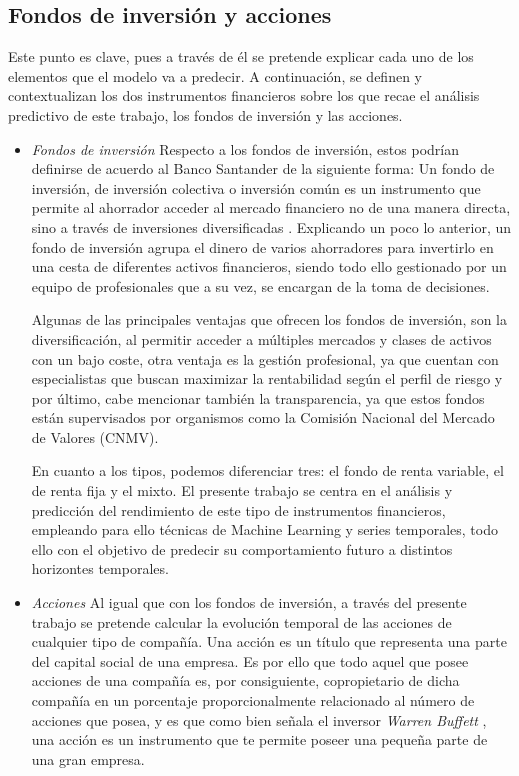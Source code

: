 \subsection{Fondos de inversión y acciones}
Este punto es clave, pues a través de él se pretende explicar cada uno de los elementos que el modelo va a predecir. A continuación, se definen y contextualizan los dos instrumentos financieros sobre los que recae el análisis predictivo de este trabajo, los fondos de inversión y las acciones.

\begin{itemize}
    \item \emph{Fondos de inversión}
    Respecto a los fondos de inversión, estos podrían definirse de acuerdo al Banco Santander \cite{Santander} de la siguiente forma: Un fondo de inversión, de inversión colectiva o inversión común es un instrumento que permite al ahorrador acceder al mercado financiero no de una manera directa, sino a través de inversiones diversificadas \cite{santander_fondos}. Explicando un poco lo anterior, un fondo de inversión agrupa el dinero de varios ahorradores para invertirlo en una cesta de diferentes activos financieros, siendo todo ello gestionado por un equipo de profesionales que a su vez, se encargan de la toma de decisiones. 
    
    Algunas de las principales ventajas que ofrecen los fondos de inversión, son la diversificación, al permitir acceder a múltiples mercados y clases de activos con un bajo coste, otra ventaja es la gestión profesional, ya que cuentan con especialistas que buscan maximizar la rentabilidad según el perfil de riesgo y por último, cabe mencionar también la transparencia, ya que estos fondos están supervisados por organismos como la Comisión Nacional del Mercado de Valores (CNMV). 
    
    En cuanto a los tipos, podemos diferenciar tres: el fondo de renta variable, el de renta fija y el mixto. El presente trabajo se centra en el análisis y predicción del rendimiento de este tipo de instrumentos financieros, empleando para ello técnicas de Machine Learning y series temporales, todo ello con el objetivo de predecir su comportamiento futuro a distintos horizontes temporales.

    \item \emph{Acciones}
    Al igual que con los fondos de inversión, a través del presente trabajo se pretende calcular la evolución temporal de las acciones de cualquier tipo de compañía. Una acción es un título que representa una parte del capital social de una empresa. Es por ello que todo aquel que posee acciones de una compañía es, por consiguiente, copropietario de dicha compañía en un porcentaje proporcionalmente relacionado al número de acciones que posea, y es que como bien señala el inversor \emph{Warren Buffett} \cite{warrbuffet}, una acción es un instrumento que te permite poseer una pequeña parte de una gran empresa. 
    

\end{itemize}
